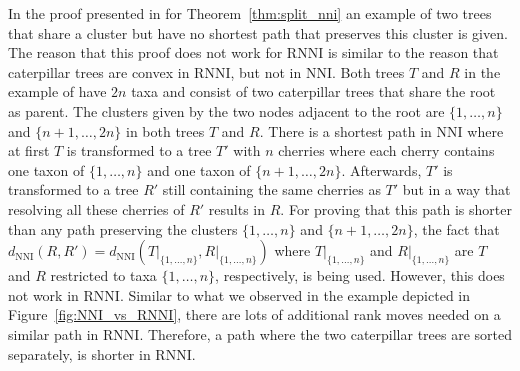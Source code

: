 \documentclass{amsart}
\newcommand{\nni}{\mathrm{NNI}}
\newcommand{\rnni}{\mathrm{RNNI}}
\begin{document}
In the proof presented in \autocite{Li1996} for Theorem~\ref{thm:split_nni} an example of two trees that share a cluster but have no shortest path that preserves this cluster is given.
The reason that this proof does not work for $\rnni$ is similar to the reason that caterpillar trees are convex in $\rnni$, but not in $\nni$.
Both trees $T$ and $R$ in the example of \autocite{Li1996} have $2n$ taxa and consist of two caterpillar trees that share the root as parent.
The clusters given by the two nodes adjacent to the root are $\{1, \ldots, n\}$ and $\{n+1, \ldots, 2n\}$ in both trees $T$ and $R$.
There is a shortest path in $\nni$ where at first $T$ is transformed to a tree $T'$ with $n$ cherries where each cherry contains one taxon of $\{1, \ldots, n\}$ and one taxon of $\{n+1, \ldots, 2n\}$.
Afterwards, $T'$ is transformed to a tree $R'$ still containing the same cherries as $T'$ but in a way that resolving all these cherries of $R'$ results in $R$.
For proving that this path is shorter than any path preserving the clusters $\{1, \ldots, n\}$ and $\{n+1, \ldots, 2n\}$, the fact that $d_{\nni}(R,R') = d_{\nni}(T{\big|}_{\{1, \ldots, n\}}, R{\big|}_{\{1, \ldots, n\}})$ where $T{\big|}_{\{1, \ldots, n\}}$ and $R{\big|}_{\{1, \ldots, n\}}$ are $T$ and $R$ restricted to taxa $\{1,\ldots,n\}$, respectively, is being used.
However, this does not work in $\rnni$.
Similar to what we observed in the example depicted in Figure~\ref{fig:NNI_vs_RNNI}, there are lots of additional rank moves needed on a similar path in $\rnni$.
Therefore, a path where the two caterpillar trees are sorted separately, is shorter in $\rnni$.
\end{document}
